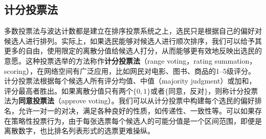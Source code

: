 \subsection{计分投票法}
多数投票法与波达计数都是建立在排序投票系统之上，选民只是根据自己的偏好对候选人进行排列。实际上，如果选民能够对候选人进行顺次排序，我们可以给予其更多的自由，使用限定的离散分值给候选人打分，从而能够更有效地反映出选民的意愿。这种投票选举的方法称作\textbf{计分投票法}（range voting，rating summation，scoring），在网络空间有广泛应用，比如网民对电影、图书、商品的1--5级评分。计分投票法根据每个候选人所有评分均值、中值（majority judgment）或加和，评分最高者胜出。如果离散分值只有两个$\{0,1\}$或者$\{$同意，反对$\}$，则称计分投票法为\textbf{同意投票法}（approve voting）。我们可以从计分投票中构建每个选民的偏好排名，允许一对一的对决，满足各种良好的性质，如传递性、一致性等。可以如果存在策略性投票行为，由于每张选票每个候选人的可能分值是一个区间范围，即便是离散数字，也比排名列表形式的选票更难操纵。

